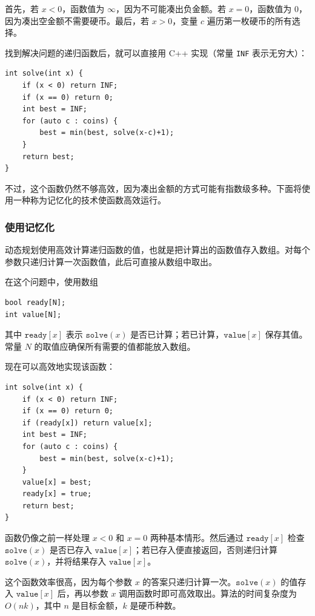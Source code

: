 首先，若 $x<0$，函数值为 $\infty$，因为不可能凑出负金额。若 $x=0$，函数值为 0，因为凑出空金额不需要硬币。最后，若 $x>0$，变量 $c$ 遍历第一枚硬币的所有选择。

找到解决问题的递归函数后，就可以直接用 C++ 实现（常量 \texttt{INF} 表示无穷大）：

\begin{lstlisting}
int solve(int x) {
    if (x < 0) return INF;
    if (x == 0) return 0;
    int best = INF;
    for (auto c : coins) {
        best = min(best, solve(x-c)+1);
    }
    return best;
}
\end{lstlisting}

不过，这个函数仍然不够高效，因为凑出金额的方式可能有指数级多种。下面将使用一种称为记忆化的技术使函数高效运行。

\subsubsection{使用记忆化}


动态规划使用高效计算递归函数的值，也就是把计算出的函数值存入数组。对每个参数只递归计算一次函数值，此后可直接从数组中取出。

在这个问题中，使用数组
\begin{lstlisting}
bool ready[N];
int value[N];
\end{lstlisting}

其中 $\texttt{ready}[x]$ 表示 $\texttt{solve}(x)$ 是否已计算；若已计算，$\texttt{value}[x]$ 保存其值。常量 $N$ 的取值应确保所有需要的值都能放入数组。

现在可以高效地实现该函数：

\begin{lstlisting}
int solve(int x) {
    if (x < 0) return INF;
    if (x == 0) return 0;
    if (ready[x]) return value[x];
    int best = INF;
    for (auto c : coins) {
        best = min(best, solve(x-c)+1);
    }
    value[x] = best;
    ready[x] = true;
    return best;
}
\end{lstlisting}

函数仍像之前一样处理 $x<0$ 和 $x=0$ 两种基本情形。然后通过 $\texttt{ready}[x]$ 检查 $\texttt{solve}(x)$ 是否已存入 $\texttt{value}[x]$；若已存入便直接返回，否则递归计算 $\texttt{solve}(x)$，并将结果存入 $\texttt{value}[x]$。

这个函数效率很高，因为每个参数 $x$ 的答案只递归计算一次。$\texttt{solve}(x)$ 的值存入 $\texttt{value}[x]$ 后，再以参数 $x$ 调用函数时即可高效取出。算法的时间复杂度为 $O(nk)$，其中 $n$ 是目标金额，$k$ 是硬币种数。

